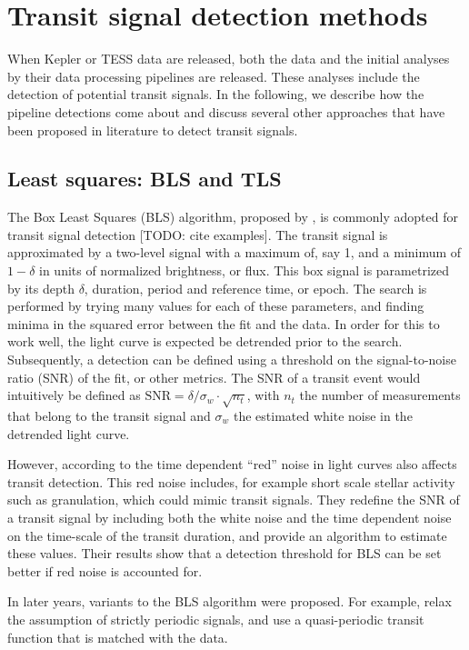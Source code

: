 
\section{Transit signal detection methods}
\red{[TODO]}

When Kepler or TESS data are released, both the data and the initial analyses by their data processing pipelines are released. These analyses include the detection of potential transit signals. In the following, we describe how the pipeline detections come about and discuss several other approaches that have been proposed in literature to detect transit signals.

\subsection{Least squares: BLS and TLS}

The Box Least Squares (BLS) algorithm, proposed by \cite{kovacs2002box}, is commonly adopted for transit signal detection [TODO: cite examples]. The transit signal is approximated by a two-level signal with a maximum of, say 1, and a minimum of $1-\delta$ in units of normalized brightness, or flux. This box signal is parametrized by its depth $\delta$, duration, period and reference time, or epoch. The search is performed by trying many values for each of these parameters, and finding minima in the squared error between the fit and the data. In order for this to work well, the light curve is expected be detrended prior to the search. Subsequently, a detection can be defined using a threshold on the signal-to-noise ratio (SNR) of the fit, or other metrics. The SNR of a transit event would intuitively be defined as $\text{SNR} = \delta / \sigma_w \cdot \sqrt{n_t}$, with $n_t$ the number of measurements that belong to the transit signal and $\sigma_w$ the estimated white noise in the detrended light curve. 
    
However, according to \cite{pont2006effect} the time dependent ``red'' noise in light curves also affects transit detection. This red noise includes, for example short scale stellar activity such as granulation, which could mimic transit signals. They redefine the SNR of a transit signal by including both the white noise and the time dependent noise on the time-scale of the transit duration, and provide an algorithm to estimate these values. Their results show that a detection threshold for BLS can be set better if red noise is accounted for.

In later years, variants to the BLS algorithm were proposed. For example, \cite{carter2013quasiperiodic} relax the assumption of strictly periodic signals, and use a quasi-periodic transit function that is matched with the data.

